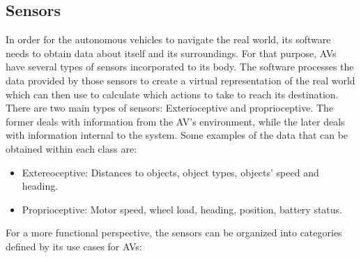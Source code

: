 \documentclass[11pt]{article}
\begin{document}
\subsection{Sensors}
In order for the autonomous vehicles to navigate the real world, its software needs to obtain data about itself and its surroundings. For that purpose, AVs have several types of sensors incorporated to its body. The software processes the data provided by those sensors to create a virtual representation of the real world which can then use to calculate which actions to take to reach its destination. There are two main types of sensors: Exterioceptive and proprioceptive. The former deals with information from the AV's environment, while the later deals with information internal to the system. Some examples of the data that can be obtained within each class are:
\begin{itemize}
	\item Extereoceptive: Distances to objects, object types, objects' speed and heading.
	\item Proprioceptive: Motor speed, wheel load, heading, position, battery status.
\end{itemize}
For a more functional perspective, the sensors can be organized into categories defined by its use cases for AVs:
\end{document}
